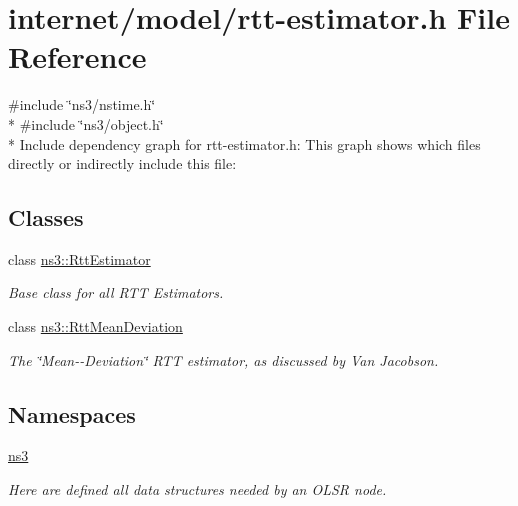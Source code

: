 \hypertarget{rtt-estimator_8h}{}\section{internet/model/rtt-\/estimator.h File Reference}
\label{rtt-estimator_8h}
{\ttfamily \#include \char`\"{}ns3/nstime.\+h\char`\"{}}\\*
{\ttfamily \#include \char`\"{}ns3/object.\+h\char`\"{}}\\*
Include dependency graph for rtt-\/estimator.h\+:
This graph shows which files directly or indirectly include this file\+:
\subsection*{Classes}
\begin{DoxyCompactItemize}
\item 
class \hyperlink{classns3_1_1RttEstimator}{ns3\+::\+Rtt\+Estimator}
\begin{DoxyCompactList}\small\item\em Base class for all R\+TT Estimators. \end{DoxyCompactList}\item 
class \hyperlink{classns3_1_1RttMeanDeviation}{ns3\+::\+Rtt\+Mean\+Deviation}
\begin{DoxyCompactList}\small\item\em The \char`\"{}\+Mean-\/-\/\+Deviation\char`\"{} R\+TT estimator, as discussed by Van Jacobson. \end{DoxyCompactList}\end{DoxyCompactItemize}
\subsection*{Namespaces}
\begin{DoxyCompactItemize}
\item 
 \hyperlink{namespacens3}{ns3}
\begin{DoxyCompactList}\small\item\em Here are defined all data structures needed by an O\+L\+SR node. \end{DoxyCompactList}\end{DoxyCompactItemize}
